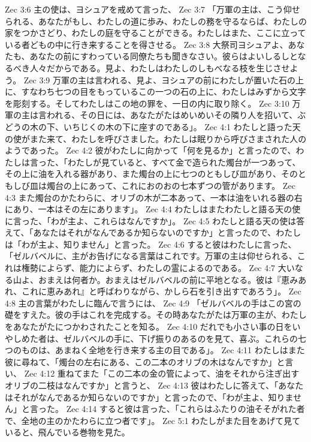 Zec 3:6  主の使は、ヨシュアを戒めて言った、
Zec 3:7  「万軍の主は、こう仰せられる、あなたがもし、わたしの道に歩み、わたしの務を守るならば、わたしの家をつかさどり、わたしの庭を守ることができる。わたしはまた、ここに立っている者どもの中に行き来することを得させる。
Zec 3:8  大祭司ヨシュアよ、あなたも、あなたの前にすわっている同僚たちも聞きなさい。彼らはよいしるしとなるべき人々だからである。見よ、わたしはわたしのしもべなる枝を生じさせよう。
Zec 3:9  万軍の主は言われる、見よ、ヨシュアの前にわたしが置いた石の上に、すなわち七つの目をもっているこの一つの石の上に、わたしはみずから文字を彫刻する。そしてわたしはこの地の罪を、一日の内に取り除く。
Zec 3:10  万軍の主は言われる、その日には、あなたがたはめいめいその隣り人を招いて、ぶどうの木の下、いちじくの木の下に座すのである」。
Zec 4:1  わたしと語った天の使がまた来て、わたしを呼びさました。わたしは眠りから呼びさまされた人のようであった。
Zec 4:2  彼がわたしに向かって「何を見るか」と言ったので、わたしは言った、「わたしが見ていると、すべて金で造られた燭台が一つあって、その上に油を入れる器があり、また燭台の上に七つのともしび皿があり、そのともしび皿は燭台の上にあって、これにおのおの七本ずつの管があります。
Zec 4:3  また燭台のかたわらに、オリブの木が二本あって、一本は油をいれる器の右にあり、一本はその左にあります」。
Zec 4:4  わたしはまたわたしと語る天の使に言った、「わが主よ、これらはなんですか」。
Zec 4:5  わたしと語る天の使は答えて、「あなたはそれがなんであるか知らないのですか」と言ったので、わたしは「わが主よ、知りません」と言った。
Zec 4:6  すると彼はわたしに言った、「ゼルバベルに、主がお告げになる言葉はこれです。万軍の主は仰せられる、これは権勢によらず、能力によらず、わたしの霊によるのである。
Zec 4:7  大いなる山よ、おまえは何者か。おまえはゼルバベルの前に平地となる。彼は『恵みあれ、これに恵みあれ』と呼ばわりながら、かしら石を引き出すであろう」。
Zec 4:8  主の言葉がわたしに臨んで言うには、
Zec 4:9  「ゼルバベルの手はこの宮の礎をすえた。彼の手はこれを完成する。その時あなたがたは万軍の主が、わたしをあなたがたにつかわされたことを知る。
Zec 4:10  だれでも小さい事の日をいやしめた者は、ゼルバベルの手に、下げ振りのあるのを見て、喜ぶ。これらの七つのものは、あまねく全地を行き来する主の目である」。
Zec 4:11  わたしはまた彼に尋ねて、「燭台の左右にある、この二本のオリブの木はなんですか」と言い、
Zec 4:12  重ねてまた「この二本の金の管によって、油をそれから注ぎ出すオリブの二枝はなんですか」と言うと、
Zec 4:13  彼はわたしに答えて、「あなたはそれがなんであるか知らないのですか」と言ったので、「わが主よ、知りません」と言った。
Zec 4:14  すると彼は言った、「これらはふたりの油そそがれた者で、全地の主のかたわらに立つ者です」。
Zec 5:1  わたしがまた目をあげて見ていると、飛んでいる巻物を見た。
